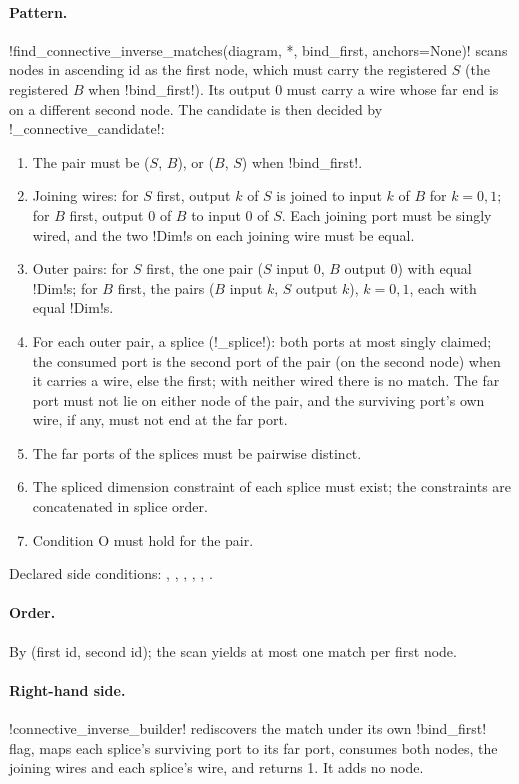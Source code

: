 \paragraph{Pattern.} \py!find_connective_inverse_matches(diagram, *, bind_first, anchors=None)! scans nodes in ascending id as the first node, which must carry the registered $S$ (the registered $B$ when \py!bind_first!). Its output 0 must carry a wire whose far end is on a different second node. The candidate is then decided by \py!_connective_candidate!:
\begin{enumerate}
\item The pair must be ($S$, $B$), or ($B$, $S$) when \py!bind_first!.
\item Joining wires: for $S$ first, output $k$ of $S$ is joined to input $k$ of $B$ for $k=0,1$; for $B$ first, output 0 of $B$ to input 0 of $S$. Each joining port must be singly wired, and the two \py!Dim!s on each joining wire must be equal.
\item Outer pairs: for $S$ first, the one pair ($S$ input 0, $B$ output 0) with equal \py!Dim!s; for $B$ first, the pairs ($B$ input $k$, $S$ output $k$), $k=0,1$, each with equal \py!Dim!s.
\item For each outer pair, a splice (\py!_splice!): both ports at most singly claimed; the consumed port is the second port of the pair (on the second node) when it carries a wire, else the first; with neither wired there is no match. The far port must not lie on either node of the pair, and the surviving port's own wire, if any, must not end at the far port.
\item The far ports of the splices must be pairwise distinct.
\item The spliced dimension constraint of each splice must exist; the constraints are concatenated in splice order.
\item Condition O must hold for the pair.
\end{enumerate}
Declared side conditions: , , , , , .

\paragraph{Order.} By (first id, second id); the scan yields at most one match per first node.

\paragraph{Right-hand side.} \py!connective_inverse_builder! rediscovers the match under its own \py!bind_first! flag, maps each splice's surviving port to its far port, consumes both nodes, the joining wires and each splice's wire, and returns 1. It adds no node.

